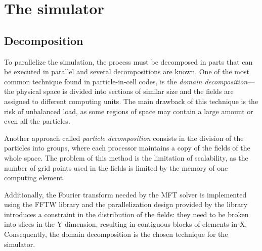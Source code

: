 \chapter{The simulator}

\section{Decomposition}

To parallelize the simulation, the process must be decomposed in parts that can 
be executed in parallel and several decompositions are known.
%
One of the most common technique found in particle-in-cell codes, is the 
\textit{domain decomposition}---the physical space is divided into sections of 
similar size and the fields are assigned to different computing units. The main 
drawback of this technique is the risk of unbalanced load, as some regions of 
space may contain a large amount or even all the particles.

Another approach called \textit{particle decomposition} consists in the division 
of the particles into groups, where each processor maintains a copy of the 
fields of the whole space.  The problem of this method is the limitation of 
scalability, as the number of grid points used in the fields is limited by the 
memory of one computing element.

Additionally, the Fourier transform needed by the MFT solver is implemented 
using the FFTW library and the parallelization design provided by the library 
introduces a constraint in the distribution of the fields: they need to be 
broken into slices in the Y dimension, resulting in contiguous blocks of 
elements in X. Consequently, the domain decomposition is the chosen technique 
for the simulator.

